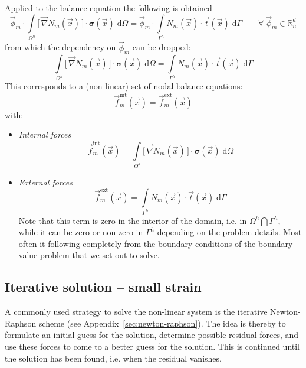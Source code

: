 \documentclass[times,namecite]{goose-article}
\begin{document}
Applied to the balance equation the following is obtained
\begin{equation}
  \vec{\phi}_m \cdot
  \int\limits_{\Omega^h}
    \big[\, \vec{\nabla} N_m (\vec{x}) \,\big]
    \cdot
    \bm{\sigma}(\vec{x}) \;
  \mathrm{d}\Omega
  =
  \vec{\phi}_m \cdot
  \int\limits_{\Gamma^h}
    N_m (\vec{x}) \cdot
    \vec{t}(\vec{x}) \;
  \mathrm{d}\Gamma
  \qquad
  \forall \; \vec{\phi}_m \in \mathbb{R}^d_n
\end{equation}
from which the dependency on $\vec{\phi}_m$ can be dropped:
\begin{equation}
  \int\limits_{\Omega^h}
    \big[\, \vec{\nabla} N_m (\vec{x}) \,\big]
    \cdot
    \bm{\sigma}(\vec{x}) \;
  \mathrm{d}\Omega
  =
  \int\limits_{\Gamma^h}
    N_m (\vec{x}) \cdot
    \vec{t}(\vec{x}) \;
  \mathrm{d}\Gamma
\end{equation}
This corresponds to a (non-linear) set of nodal balance equations:
\begin{equation}
  \vec{f}_m^\mathrm{int}(\vec{x})
  =
  \vec{f}_m^\mathrm{ext}(\vec{x})
\end{equation}
with:
\begin{itemize}
  \item \emph{Internal forces}
  \begin{equation}
    \vec{f}_m^\mathrm{int}(\vec{x})
    =
    \int\limits_{\Omega^h}
      \big[\, \vec{\nabla} N_m (\vec{x}) \,\big]
      \cdot
      \bm{\sigma}(\vec{x}) \;
    \mathrm{d}\Omega
  \end{equation}
  \item \emph{External forces}
  \begin{equation}
    \vec{f}_m^\mathrm{ext}(\vec{x})
    =
    \int\limits_{\Gamma^h}
      N_m (\vec{x}) \cdot
      \vec{t}(\vec{x}) \;
    \mathrm{d}\Gamma
  \end{equation}
  Note that this term is zero in the interior of the domain, i.e. in $\Omega^h \bigcap \Gamma^h$, while it can be zero or non-zero in $\Gamma^h$ depending on the problem details. Most often it following completely from the boundary conditions of the boundary value problem that we set out to solve.
\end{itemize}

\subsection{Iterative solution -- small strain}

A commonly used strategy to solve the non-linear system is the iterative Newton-Raphson scheme (see Appendix~\ref{sec:newton-raphson}). The idea is thereby to formulate an initial guess for the solution, determine possible residual forces, and use these forces to come to a better guess for the solution. This is continued until the solution has been found, i.e. when the residual vanishes.
\end{document}
